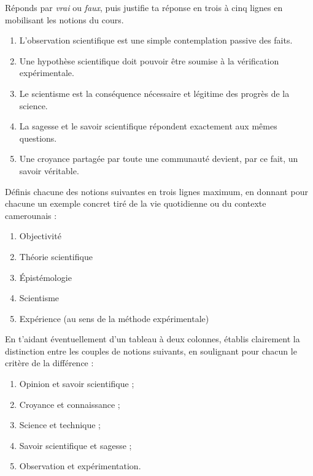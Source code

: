 \documentclass[11pt]{article}
\newcommand{\cle}[1]{{\popxbold\color{popdark}#1}}
\begin{document}
\begin{exercice}
Réponds par \emph{vrai} ou \emph{faux}, puis justifie ta réponse en trois à cinq lignes en mobilisant les notions du cours.

\begin{enumerate}
\item L'observation scientifique est une simple contemplation passive des faits.
\item Une hypothèse scientifique doit pouvoir être soumise à la vérification expérimentale.
\item Le scientisme est la conséquence nécessaire et légitime des progrès de la science.
\item La sagesse et le savoir scientifique répondent exactement aux mêmes questions.
\item Une croyance partagée par toute une communauté devient, par ce fait, un savoir véritable.
\end{enumerate}
\end{exercice}

\begin{exercice}
Définis chacune des notions suivantes en trois lignes maximum, en donnant pour chacune un exemple concret tiré de la vie quotidienne ou du contexte camerounais :

\begin{enumerate}
\item \cle{Objectivité}
\item \cle{Théorie scientifique}
\item \cle{Épistémologie}
\item \cle{Scientisme}
\item \cle{Expérience} (au sens de la méthode expérimentale)
\end{enumerate}
\end{exercice}

\begin{exercice}
En t'aidant éventuellement d'un tableau à deux colonnes, établis clairement la distinction entre les couples de notions suivants, en soulignant pour chacun le critère de la différence :

\begin{enumerate}
\item Opinion et savoir scientifique ;
\item Croyance et connaissance ;
\item Science et technique ;
\item Savoir scientifique et sagesse ;
\item Observation et expérimentation.
\end{enumerate}
\end{exercice}
\end{document}

